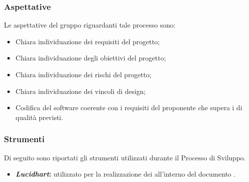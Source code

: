 \subsubsection{Aspettative}
Le aspettative del gruppo riguardanti tale processo sono:
\begin{itemize}
\item Chiara individuazione dei requisiti del progetto;
\item Chiara individuazione degli obiettivi del progetto;
\item Chiara individuazione dei rischi del progetto;
\item Chiara individuazione dei vincoli di design;
\item Codifica del software coerente con i requisiti del proponente che supera i  di qualità previsti.
\end{itemize}





\subsubsection{Strumenti}\label{PS_Strumenti}
Di seguito sono riportati gli strumenti utilizzati durante il Processo di Sviluppo.
\begin{itemize}
	\item \textbf{\textit{Lucidhart}:} utilizzato per la realizzazione dei  all'interno del documento .
\end{itemize}

\newpage

